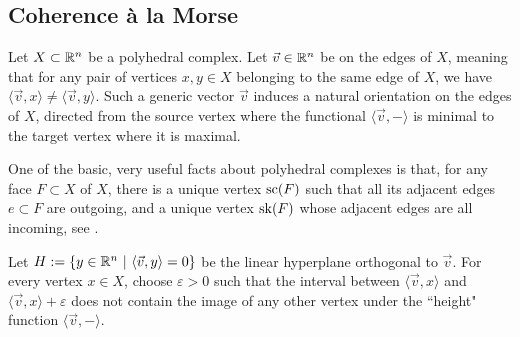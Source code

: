 


\subsection{Coherence \`a la Morse}

Let $X\subset \mathbb R^n$ be a polyhedral complex. 
Let $\vec v \in \mathbb R^n$ be  on the edges of $X$, meaning that for any pair of vertices $x,y \in X$ belonging to the same edge of $X$, we have $\langle \vec v , x \rangle \neq \langle \vec v, y\rangle$.  
Such a generic vector $\vec v$ induces a natural orientation on the edges of $X$, directed from the source vertex where the functional $\langle \vec v, - \rangle$ is minimal to the target vertex where it is maximal. 

One of the basic, very useful facts about polyhedral complexes is that, for any face $F \subset X$ of $X$, there is a unique  vertex $\mathrm{sc}(F)$ such that all its adjacent edges $e \subset F$ are outgoing, and a unique  vertex $\mathrm{sk}(F)$ whose adjacent edges are all incoming, see \cite[Thm.~3.7]{Ziegler95}.

Let $H:=\{y \in \mathbb R^n \ | \ \langle \vec v , y \rangle = 0\}$ be the linear hyperplane orthogonal to $\vec v$.  
For every vertex $x \in X$, choose $\varepsilon >0$ such that the interval between $\langle \vec v , x \rangle$ and $\langle \vec v , x \rangle + \varepsilon$ does not contain the image of any other vertex under the ``height" function $\langle \vec v, - \rangle$. 

